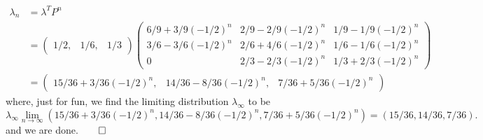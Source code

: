 \documentclass[11pt, letterpaper]{article}
\begin{document}
    \begin{align*}
        \lambda_n&=\lambda^T P^n\\
        &=\begin{pmatrix}
            1/2, & 1/6, & 1/3
        \end{pmatrix}\begin{pmatrix}
            6/9+3/9(-1/2)^n & 2/9 -2/9(-1/2)^n & 1/9 - 1/9(-1/2)^n\\
            3/6 - 3/6(-1/2)^n & 2/6+4/6(-1/2)^n & 1/6 - 1/6(-1/2)^n\\
            0 & 2/3 - 2/3(-1/2)^n & 1/3 + 2/3(-1/2)^n
        \end{pmatrix}\\
        &=\begin{pmatrix}
            15/36+3/36(-1/2)^n, & 14/36 - 8/36(-1/2)^n, & 7/36 + 5/36(-1/2)^n
        \end{pmatrix}
    \end{align*}
    where, just for fun, we find the limiting distribution $\lambda_\infty$ to be
    \[\lambda_\infty\lim_{n\rightarrow\infty}(15/36+3/36(-1/2)^n, 14/36 - 8/36(-1/2)^n, 7/36 + 5/36(-1/2)^n)=(15/36,14/36,7/36).\]
    and we are done.\hfill{$\qed$}
\end{document}
